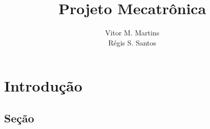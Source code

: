 \documentclass[a4paper,12pt]{memoir}
\title{Projeto Mecatr\^onica}
\author{Vitor M. Martins\\ R\'egis S. Santos}
\date{}
\begin{document}
\begin{titlingpage}
  \maketitle
\end{titlingpage}

\tableofcontents

\chapter{Introdução}

\lipsum[1]


\lipsum[2-7]


\section{Seção}

\lipsum[1-10]
\end{document}
